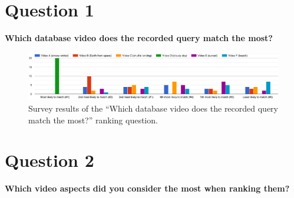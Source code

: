\section{Question 1}

\textbf{Which database video does the recorded query match the most?}

\begin{figure}[h] 
\centerline{\includegraphics[width=\textwidth]{figures/appendix/survey_results.png}}
\caption{\label{fig:appendix_survey_results}Survey results of the ``Which database video does the recorded query match the most?'' ranking question.}
\end{figure}

\section{Question 2}

\textbf{Which video aspects did you consider the most when ranking them?}

